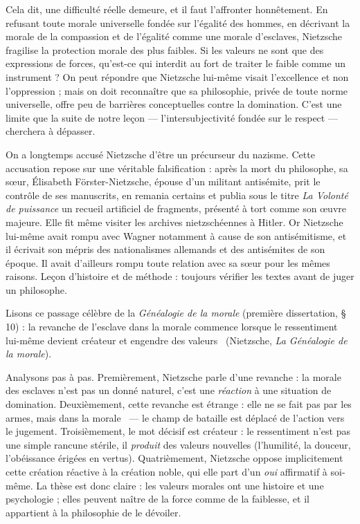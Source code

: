 \documentclass[11pt]{article}
\begin{document}
Cela dit, une difficulté réelle demeure, et il faut l'affronter honnêtement. En refusant toute morale universelle fondée sur l'égalité des hommes, en décrivant la morale de la compassion et de l'égalité comme une morale d'esclaves, Nietzsche fragilise la protection morale des plus faibles. Si les valeurs ne sont que des expressions de forces, qu'est-ce qui interdit au fort de traiter le faible comme un instrument ? On peut répondre que Nietzsche lui-même visait l'excellence et non l'oppression ; mais on doit reconnaître que sa philosophie, privée de toute norme universelle, offre peu de barrières conceptuelles contre la domination. C'est une limite que la suite de notre leçon — l'intersubjectivité fondée sur le respect — cherchera à dépasser.

\begin{savaistu}
On a longtemps accusé Nietzsche d'être un précurseur du nazisme. Cette accusation repose sur une véritable falsification : après la mort du philosophe, sa sœur, Élisabeth Förster-Nietzsche, épouse d'un militant antisémite, prit le contrôle de ses manuscrits, en remania certains et publia sous le titre \emph{La Volonté de puissance} un recueil artificiel de fragments, présenté à tort comme son œuvre majeure. Elle fit même visiter les archives nietzschéennes à Hitler. Or Nietzsche lui-même avait rompu avec Wagner notamment à cause de son antisémitisme, et il écrivait son mépris des nationalismes allemands et des antisémites de son époque. Il avait d'ailleurs rompu toute relation avec sa sœur pour les mêmes raisons. Leçon d'histoire et de méthode : toujours vérifier les textes avant de juger un philosophe.
\end{savaistu}

\begin{experience}
Lisons ce passage célèbre de la \emph{Généalogie de la morale} (première dissertation, § 10) : \guillemotleft la revanche de l'esclave dans la morale commence lorsque le ressentiment lui-même devient créateur et engendre des valeurs \guillemotright\ (Nietzsche, \emph{La Généalogie de la morale}).

Analysons pas à pas. Premièrement, Nietzsche parle d'une \guillemotleft revanche \guillemotright : la morale des esclaves n'est pas un donné naturel, c'est une \emph{réaction} à une situation de domination. Deuxièmement, cette revanche est étrange : elle ne se fait pas par les armes, mais \guillemotleft dans la morale \guillemotright\ — le champ de bataille est déplacé de l'action vers le jugement. Troisièmement, le mot décisif est \guillemotleft créateur \guillemotright : le ressentiment n'est pas une simple rancune stérile, il \emph{produit} des valeurs nouvelles (l'humilité, la douceur, l'obéissance érigées en vertus). Quatrièmement, Nietzsche oppose implicitement cette création réactive à la création noble, qui elle part d'un \emph{oui} affirmatif à soi-même. La thèse est donc claire : les valeurs morales ont une histoire et une psychologie ; elles peuvent naître de la force comme de la faiblesse, et il appartient à la philosophie de le dévoiler.
\end{experience}
\end{document}
